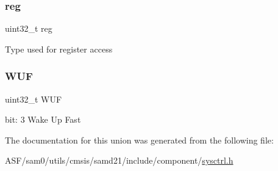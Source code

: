 \subsubsection{\texorpdfstring{reg}{reg}}
{\footnotesize\ttfamily uint32\+\_\+t reg}

Type used for register access \mbox{\label{union_s_y_s_c_t_r_l___d_p_l_l_c_t_r_l_b___type_afa2323ca402dcfe96d75760d3fc651fa}} 
\subsubsection{\texorpdfstring{WUF}{WUF}}
{\footnotesize\ttfamily uint32\+\_\+t W\+UF}

bit\+: 3 Wake Up Fast 

The documentation for this union was generated from the following file\+:\begin{DoxyCompactItemize}
\item 
A\+S\+F/sam0/utils/cmsis/samd21/include/component/\mbox{\hyperlink{component_2sysctrl_8h}{sysctrl.\+h}}\end{DoxyCompactItemize}
